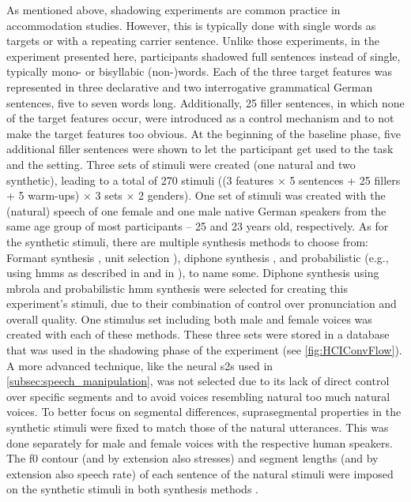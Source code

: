 As mentioned above, shadowing experiments are common practice in accommodation studies.
However, this is typically done with single words as targets or with a repeating carrier sentence.
Unlike those experiments, in the experiment presented here, participants shadowed full sentences instead of single, typically mono- or bisyllabic (non-)words.
Each of the three target features was represented in three declarative and two interrogative grammatical German sentences, five to seven words long.
Additionally, 25 filler sentences, in which none of the target features occur, were introduced as a control mechanism and to not make the target features too obvious.
At the beginning of the baseline phase, five additional filler sentences were shown to let the participant get used to the task and the setting.
Three sets of stimuli were created (one natural and two synthetic), leading to a total of 270 stimuli ((3 features $\times$ 5 sentences + 25 fillers + 5 warm-ups) $\times$ 3 sets $\times$ 2 genders).
One set of stimuli was created with the (natural) speech of one female and one male native German speakers from the same age group of most participants -- 25 and 23 years old, respectively.
As for the synthetic stimuli, there are multiple synthesis methods to choose from:
Formant synthesis \citep[e.g.,][]{Burkhardt2000verification}, unit selection \citep{Hunt1996unit,Black2003unit}), diphone synthesis \citep[e.g.,][]{Dutoit1996mbrola}, and probabilistic (e.g., using \acp{hmm} as described in \citet{Zen2005overview} and in \citet{Zen2009statistical}), to name some.
Diphone synthesis using \acl{mbrola} \citep[\acs{mbrola};][]{Dutoit1996mbrola} and probabilistic \ac{hmm} synthesis were selected for creating this experiment's stimuli, due to their combination of control over pronunciation and overall quality.
One stimulus set including both male and female voices was created with each of these methods.
These three sets were stored in a database that was used in the shadowing phase of the experiment (see \cref{fig:HCIConvFlow}).
A more advanced technique, like the neural \ac{s2s} used in \cref{subsec:speech_manipulation}, was not selected due to its lack of direct control over specific segments and to avoid voices resembling natural too much natural voices.
To better focus on segmental differences, suprasegmental properties in the synthetic stimuli were fixed to match those of the natural utterances.
This was done separately for male and female voices with the respective human speakers.
The \ac{f0} contour (and by extension also stresses) and segment lengths (and by extension also speech rate) of each sentence of the natural stimuli were imposed on the synthetic stimuli in both synthesis methods \citep[and see][]{Raveh2017ESSV}.
